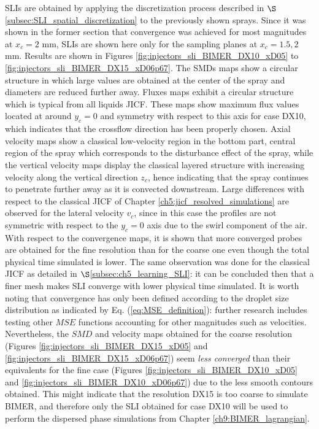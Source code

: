 


\newcommand\scaleSLIBIMER{0.175}

SLIs are obtained by applying the discretization process described in $\S$\ref{subsec:SLI_spatial_discretization} to the previously shown sprays. Since it was shown in the former section that convergence was achieved for most magnitudes at $x_c = 2$ mm, SLIs are shown here only for the sampling planes at $x_c = 1.5, 2$ mm. Results are shown in Figures \ref{fig:injectors_sli_BIMER_DX10_xD05} to  \ref{fig:injectors_sli_BIMER_DX15_xD06p67}. The SMDs maps show a circular structure in which large values are obtained at the center of the spray and diameters are reduced further away. Fluxes maps exhibit a circular structure which is typical from all liquids JICF. These maps show maximum flux values located at around $y_c = 0$ and symmetry with respect to this axis for case DX10, which indicates that the crossflow direction has been properly chosen. Axial velocity maps show a classical low-velocity region in the bottom part, central region of the spray which corresponds to the disturbance effect of the spray, while the vertical velocity maps display the classical layered structure with increasing velocity along the vertical direction $z_c$, hence indicating that the spray continues to penetrate further away as it is convected downstream. Large differences with respect to the classical JICF of Chapter \ref{ch5:jicf_resolved_simulations} are observed for the lateral velocity $v_c$, since in this case the profiles are not symmetric with respect to the $y_c = 0$ axis due to the swirl component of the air. With respect to the convergence maps, it is shown that more converged probes are obtained for the fine resolution than for the coarse one even though the total physical time simulated is lower. The same observation was done for the classical JICF as detailed in $\S$\ref{subsec:ch5_learning_SLI}: it can be concluded then that a finer mesh makes SLI converge with lower physical time simulated. It is worth noting that convergence has only been defined according to the droplet size distribution as indicated by Eq. (\ref{eq:MSE_definition}): further research includes testing other $MSE$ functions accounting for other magnitudes such as velocities. Nevertheless, the $SMD$ and velocity maps obtained for the coarse resolution (Figures \ref{fig:injectors_sli_BIMER_DX15_xD05} and \ref{fig:injectors_sli_BIMER_DX15_xD06p67}) seem \textsl{less converged} than their equivalents for the fine case (Figures \ref{fig:injectors_sli_BIMER_DX10_xD05} and \ref{fig:injectors_sli_BIMER_DX10_xD06p67}) due to the less smooth contours obtained. This might indicate that the resolution DX15 is too coarse to simulate BIMER, and therefore only the SLI obtained for case DX10 will be used to perform the dispersed phase simulations from Chapter \ref{ch9:BIMER_lagrangian}.


